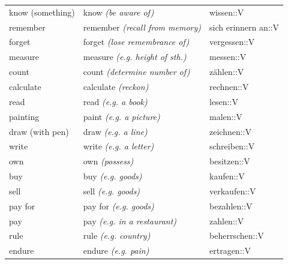 \begin{center}
\begin{longtable}{lll}
{\sc \lowercase{	KNOW \footnotesize (SOMETHING)	}}	&	know	\textit{\footnotesize (be aware of)}	&	wissen::V	\\
{\sc \lowercase{	REMEMBER	}}	&	remember	\textit{\footnotesize (recall from memory)}	&	sich erinnern an::V	\\
{\sc \lowercase{	FORGET	}}	&	forget	\textit{\footnotesize (lose remembrance of)}	&	vergessen::V	\\
{\sc \lowercase{	MEASURE	}}	&	measure	\textit{\footnotesize (e.g. height of sth.)}	&	messen::V	\\
{\sc \lowercase{	COUNT	}}	&	count	\textit{\footnotesize (determine number of)}	&	zählen::V	\\
{\sc \lowercase{	CALCULATE	}}	&	calculate	\textit{\footnotesize (reckon)}	&	rechnen::V	\\
{\sc \lowercase{	READ	}}	&	read	\textit{\footnotesize (e.g. a book)}	&	lesen::V	\\
{\sc \lowercase{	PAINTING	}}	&	paint	\textit{\footnotesize (e.g. a picture)}	&	malen::V	\\
{\sc \lowercase{	DRAW \footnotesize (WITH PEN)	}}	&	draw	\textit{\footnotesize (e.g. a line)}	&	zeichnen::V	\\
{\sc \lowercase{	WRITE	}}	&	write	\textit{\footnotesize (e.g. a letter)}	&	schreiben::V	\\
{\sc \lowercase{	OWN	}}	&	own	\textit{\footnotesize (possess)}	&	besitzen::V	\\
{\sc \lowercase{	BUY	}}	&	buy	\textit{\footnotesize (e.g. goods)}	&	kaufen::V	\\
{\sc \lowercase{	SELL	}}	&	sell	\textit{\footnotesize (e.g. goods)}	&	verkaufen::V	\\
{\sc \lowercase{	PAY FOR	}}	&	pay for	\textit{\footnotesize (e.g. goods)}	&	bezahlen::V	\\
{\sc \lowercase{	PAY	}}	&	pay	\textit{\footnotesize (e.g. in a restaurant)}	&	zahlen::V	\\
{\sc \lowercase{	RULE	}}	&	rule	\textit{\footnotesize (e.g. country)}	&	beherrschen::V	\\
{\sc \lowercase{	ENDURE	}}	&	endure	\textit{\footnotesize (e.g. pain)}	&	ertragen::V	\\

\end{longtable}
 \addtocounter{table}{-1} 
 
\end{center}

